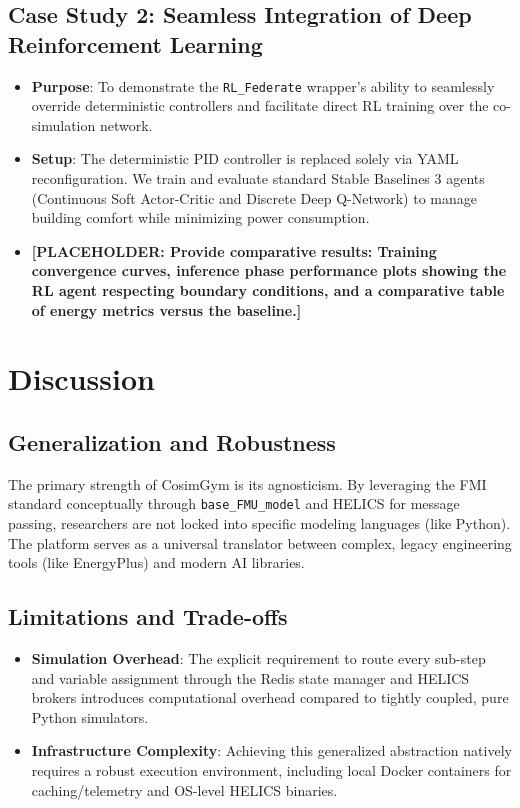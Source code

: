 \subsection{Case Study 2: Seamless Integration of Deep Reinforcement Learning}
\begin{itemize}
    \item \textbf{Purpose}: To demonstrate the \texttt{RL\_Federate} wrapper's ability to seamlessly override deterministic controllers and facilitate direct RL training over the co-simulation network.
    \item \textbf{Setup}: The deterministic PID controller is replaced solely via YAML reconfiguration. We train and evaluate standard Stable Baselines 3 agents (Continuous Soft Actor-Critic and Discrete Deep Q-Network) to manage building comfort while minimizing power consumption.
    \item \textbf{[PLACEHOLDER: Provide comparative results: Training convergence curves, inference phase performance plots showing the RL agent respecting boundary conditions, and a comparative table of energy metrics versus the baseline.]}
\end{itemize}

\section{Discussion}

\subsection{Generalization and Robustness}
The primary strength of CosimGym is its agnosticism. By leveraging the FMI standard conceptually through \texttt{base\_FMU\_model} and HELICS for message passing, researchers are not locked into specific modeling languages (like Python). The platform serves as a universal translator between complex, legacy engineering tools (like EnergyPlus) and modern AI libraries. 

\subsection{Limitations and Trade-offs}
\begin{itemize}
    \item \textbf{Simulation Overhead}: The explicit requirement to route every sub-step and variable assignment through the Redis state manager and HELICS brokers introduces computational overhead compared to tightly coupled, pure Python simulators. 
    \item \textbf{Infrastructure Complexity}: Achieving this generalized abstraction natively requires a robust execution environment, including local Docker containers for caching/telemetry and OS-level HELICS binaries.
\end{itemize}


